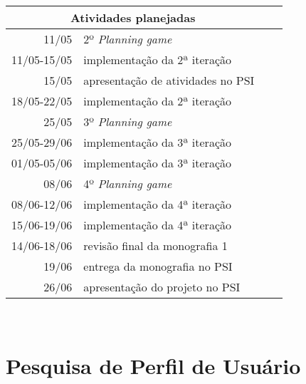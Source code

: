 \documentclass[a4paper,12pt,font=plain,header=plain]{abnt}
\begin{document}
	\begin{tabularx}{0.9\linewidth}[|l|]{ |r|X|l|X| }
	\hline
		\multicolumn{2}{|c|}{\textbf{Atividades planejadas}} \\
	\hline
		11/05 & 2º \textit{Planning game} \\
	\hline
		11/05-15/05 & implementação da 2ª iteração \\
	\hline
		15/05 & apresentação de atividades no PSI \\
	\hline
		18/05-22/05 & implementação da 2ª iteração \\
	\hline
		25/05 & 3º \textit{Planning game} \\
	\hline
		25/05-29/06 & implementação da 3ª iteração \\
	\hline
		01/05-05/06 & implementação da 3ª iteração \\
	\hline
		08/06 & 4º \textit{Planning game} \\
	\hline
		08/06-12/06 & implementação da 4ª iteração \\
	\hline
		15/06-19/06 & implementação da 4ª iteração \\
	\hline
		14/06-18/06 & revisão final da monografia 1 \\
	\hline
		19/06 & entrega da monografia no PSI \\
	\hline
		26/06 & apresentação do projeto no PSI \\
	\hline
	\end{tabularx} \\



\apendice
\chapter{Pesquisa de Perfil de Usuário}
  
\end{document}
